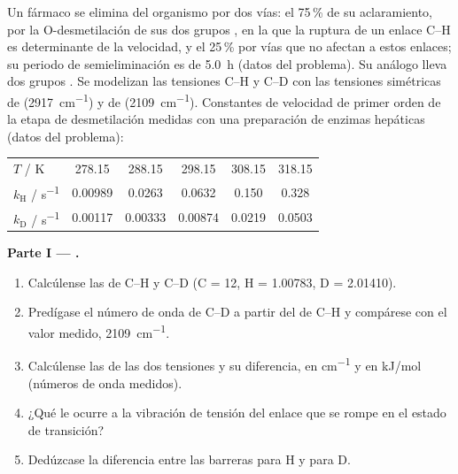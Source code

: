 \begin{problem}
\label{pb:b3:rate-theories:1}
Un fármaco se elimina del organismo por dos vías: el 75\,\% de su aclaramiento, por la
O-desmetilación de sus dos grupos , en la que la ruptura de un enlace C--H es
determinante de la velocidad, y el 25\,\% por vías que no afectan a estos enlaces; su
periodo de semieliminación es de \qty{5.0}{h} (datos del problema). Su análogo lleva dos grupos .
Se modelizan las tensiones C--H y C--D con las tensiones simétricas de 
(\qty{2917}{cm^{-1}}) y de  (\qty{2109}{cm^{-1}}). Constantes de velocidad de primer orden de la
etapa de desmetilación medidas con una preparación de enzimas hepáticas (datos del
problema):
\begin{center}\small
\begin{tabular}{lccccc}
\hline
$T$ / K & 278.15 & 288.15 & 298.15 & 308.15 & 318.15 \\
$k_{\mathrm H}$ / \unit{s^{-1}} & 0.00989 & 0.0263 & 0.0632 & 0.150 & 0.328 \\
$k_{\mathrm D}$ / \unit{s^{-1}} & 0.00117 & 0.00333 & 0.00874 & 0.0219 & 0.0503 \\ \hline
\end{tabular}
\end{center}

\medskip\noindent\textbf{Parte I --- .}
\begin{enumerate}
  \item Calcúlense las  de C--H y C--D (C = 12, H = 1.00783,
        D = 2.01410).
  \item Predígase el número de onda de C--D a partir del de C--H y compárese con el
        valor medido, \qty{2109}{cm^{-1}}.
  \item Calcúlense las  de las dos tensiones y su
        diferencia, en \unit{cm^{-1}} y en \unit{kJ/mol} (números de onda medidos).
  \item ¿Qué le ocurre a la vibración de tensión del enlace que se rompe en
        el estado de transición?
  \item Dedúzcase la diferencia entre las barreras para H y para D.
\end{enumerate}


\end{problem}
